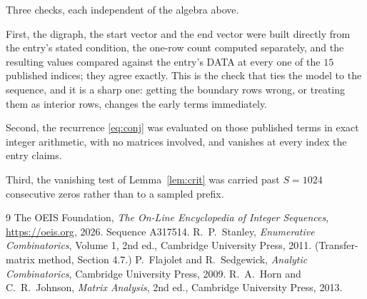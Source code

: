 \documentclass[11pt,a4paper]{article}
\theoremstyle{plain}
\theoremstyle{definition}
\begin{document}
Three checks, each independent of the algebra above.

First, the digraph, the start vector and the end vector were built directly from the
entry's stated condition, the one-row count computed separately, and the resulting values
compared against the entry's DATA at every one of the $15$ published indices; they
agree exactly. This is the check that ties the model to the sequence, and it is a sharp one:
getting the boundary rows wrong, or treating them as interior rows, changes the early terms
immediately.

Second, the recurrence \eqref{eq:conj} was evaluated on those published terms in exact
integer arithmetic, with no matrices involved, and vanishes at every index the entry claims.

Third, the vanishing test of Lemma~\ref{lem:crit} was carried past $S=1024$ consecutive
zeros rather than to a sampled prefix.

\begin{thebibliography}{9}
 The OEIS Foundation, \emph{The On-Line Encyclopedia of Integer
Sequences}, \url{https://oeis.org}, 2026. Sequence A317514.
 R.~P.~Stanley, \emph{Enumerative Combinatorics}, Volume 1, 2nd ed.,
Cambridge University Press, 2011. (Transfer-matrix method, Section 4.7.)
 P.~Flajolet and R.~Sedgewick, \emph{Analytic Combinatorics}, Cambridge
University Press, 2009.
 R.~A.~Horn and C.~R.~Johnson, \emph{Matrix Analysis}, 2nd ed., Cambridge
University Press, 2013.
\end{thebibliography}
\end{document}
